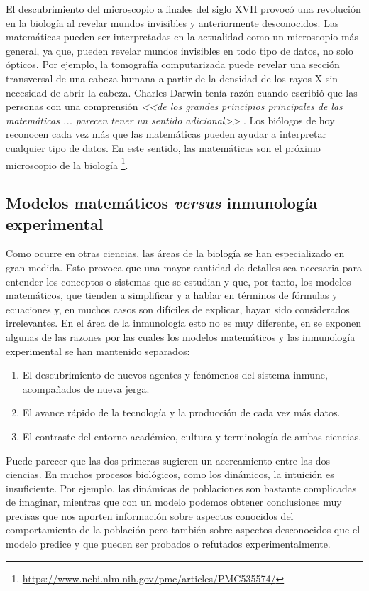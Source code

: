 El descubrimiento del microscopio a finales del siglo XVII provocó una revolución en la biología al revelar mundos invisibles y anteriormente desconocidos. Las matemáticas pueden ser interpretadas en la actualidad como un microscopio más general, ya que, pueden revelar mundos invisibles en todo tipo de datos, no solo ópticos. Por ejemplo, la tomografía computarizada puede revelar una sección transversal de una cabeza humana a partir de la densidad de los rayos X sin necesidad de abrir la cabeza. Charles Darwin tenía razón cuando escribió que las personas con una comprensión \textit{<<de los grandes principios principales de las matemáticas ... parecen tener un sentido adicional>>} \citep{darwin1887life}. Los biólogos de hoy reconocen cada vez más que las matemáticas pueden ayudar a interpretar cualquier tipo de datos. En este sentido, las matemáticas son el próximo microscopio de la biología \footnote{\url{https://www.ncbi.nlm.nih.gov/pmc/articles/PMC535574/}}.

\subsection{Modelos matemáticos \textit{versus} inmunología experimental}

Como ocurre en otras ciencias, las áreas de la biología se han especializado en gran medida. Esto provoca que una mayor cantidad de detalles sea necesaria para entender los conceptos o sistemas que se estudian y que, por tanto, los modelos matemáticos, que tienden a simplificar y a hablar en términos de fórmulas y ecuaciones y, en muchos casos son difíciles de explicar, hayan sido considerados irrelevantes. En el área de la inmunología esto no es muy diferente, en \cite{mathsModInmu} se exponen algunas de las razones por las cuales los modelos matemáticos y las inmunología experimental se han mantenido separados:

\begin{enumerate}
	\item El descubrimiento de nuevos agentes y fenómenos del sistema inmune, acompañados de nueva jerga.
	
	\item El avance rápido de la tecnología y la producción de cada vez más datos.
	
	\item El contraste del entorno académico, cultura y terminología de ambas ciencias.
\end{enumerate}

Puede parecer que las dos primeras sugieren un acercamiento entre las dos ciencias. En muchos procesos biológicos, como los dinámicos, la intuición es insuficiente. Por ejemplo, las dinámicas de poblaciones son bastante complicadas de imaginar, mientras que con un modelo podemos obtener conclusiones muy precisas que nos aporten información sobre aspectos conocidos del comportamiento de la población pero también sobre aspectos desconocidos que el modelo predice y que pueden ser probados o refutados experimentalmente.

